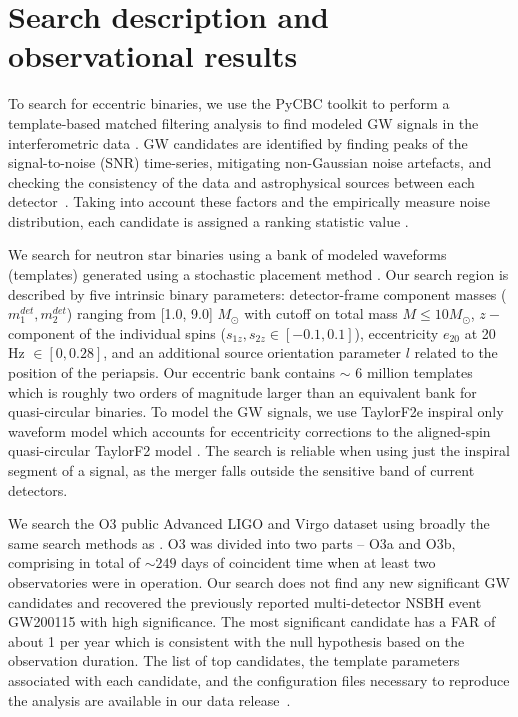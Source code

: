 \documentclass[floatfix,lengthcheck,showpacs,amssymb,amsmath,amsfonts,twocolumn,nofootinbib,longbibliography]{revtex4-1}
\begin{document}
\section{Search description and observational results}
To search for eccentric binaries, we use the PyCBC toolkit to perform a template-based matched filtering analysis to find modeled GW signals in the interferometric data \cite{Usman:2015kfa,Nitz:2017svb}. GW candidates are identified by finding peaks of the signal-to-noise (SNR) time-series, mitigating non-Gaussian noise artefacts, and checking the consistency of the data and astrophysical sources between each detector~\cite{Allen:2004gu, Nitz:2017lco,Davies:2020tsx}. Taking into account these factors and the empirically measure noise distribution, each candidate is assigned a ranking statistic value \cite{Nitz:2017svb, Davies:2020tsx, Was:2009vh}.

We search for neutron star binaries using a bank of modeled waveforms (templates) generated using a stochastic placement method \cite{Harry:2009ea,Babak:2008rb}. Our   
search region is described by five intrinsic binary parameters: detector-frame component masses ($m_1^{det}, m_2^{det}$) ranging from [1.0, 9.0] $M_{\odot}$ with cutoff on total mass $M \leq 10 M_{\odot}$, $z-$ component of the individual spins ($s_{1z}, s_{2z} \in [-0.1, 0.1]$), eccentricity $e_{20}$ at 20 Hz $\in [0, 0.28]$, and an additional source orientation parameter $l$ related to the position of the periapsis. Our eccentric bank contains $\sim$ 6 million templates which is roughly two orders of magnitude larger than an equivalent bank for quasi-circular binaries. To model the GW signals, we use TaylorF2e inspiral only waveform model \cite{Moore:2016qxz} which accounts for eccentricity corrections to the aligned-spin quasi-circular TaylorF2 model \cite{Buonanno:2009zt}. The search is reliable when using just the inspiral segment of a signal, as the merger falls outside the sensitive band of current detectors. 

We search the O3 public Advanced LIGO and Virgo dataset using broadly the same search methods as \cite{Nitz:2021zwj}. O3 was divided into two parts -- O3a and O3b, comprising in total of $\sim 249$ days of coincident time when at least two observatories were in operation. Our search does not find any new significant GW candidates and recovered the previously reported multi-detector NSBH event GW200115 with high significance. The most significant candidate has a FAR of about 1 per year which is consistent with the null hypothesis based on the observation duration. The list of top candidates, the template parameters associated with each candidate, and the configuration files necessary to reproduce the analysis are available in our data release~\cite{github}.  
\end{document}
